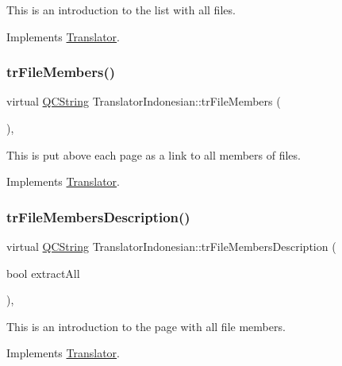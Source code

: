 This is an introduction to the list with all files. 

Implements \mbox{\hyperlink{class_translator}{Translator}}.

\mbox{\label{class_translator_indonesian_a4f0cf3dc04da97ee1f56144facabc88a}} 
\subsubsection{\texorpdfstring{trFileMembers()}{trFileMembers()}}
{\footnotesize\ttfamily virtual \mbox{\hyperlink{class_q_c_string}{Q\+C\+String}} Translator\+Indonesian\+::tr\+File\+Members (\begin{DoxyParamCaption}{ }\end{DoxyParamCaption})\hspace{0.3cm}{\ttfamily [inline]}, {\ttfamily [virtual]}}

This is put above each page as a link to all members of files. 

Implements \mbox{\hyperlink{class_translator}{Translator}}.

\mbox{\label{class_translator_indonesian_ad30978bff0c37e7bdab92af631e31e37}} 
\subsubsection{\texorpdfstring{trFileMembersDescription()}{trFileMembersDescription()}}
{\footnotesize\ttfamily virtual \mbox{\hyperlink{class_q_c_string}{Q\+C\+String}} Translator\+Indonesian\+::tr\+File\+Members\+Description (\begin{DoxyParamCaption}\item[{bool}]{extract\+All }\end{DoxyParamCaption})\hspace{0.3cm}{\ttfamily [inline]}, {\ttfamily [virtual]}}

This is an introduction to the page with all file members. 

Implements \mbox{\hyperlink{class_translator}{Translator}}.

